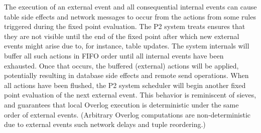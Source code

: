 \documentclass{vldb}
\begin{document}
The execution of an external event and all consequential internal events 
can cause table side effects and network messages to occur from the
actions from some rules triggered during the fixed point evaluation.  
The
P2 system treats ensures that they are not visible until the end of the fixed point
after which new external events might arise due to, for instance, table updates. 
The system internals will buffer all such actions in FIFO order until 
all internal events have been exhausted.  
Once that occurs, the buffered (external) actions will be applied, 
potentially resulting in database side effects and remote
send operations.  
When all actions have been flushed, the P2 system 
scheduler will begin another fixed point evaluation of the next external
event.  
This behavior is reminiscent of sieves, and guarantees that local 
Overlog execution is deterministic under the same order of external
events. 
(Arbitrary Overlog computations are 
non-deterministic due to external events such network delays and tuple reordering.)
\end{document}
